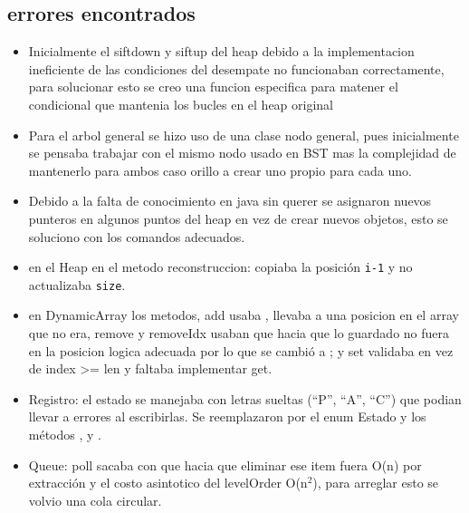 \documentclass[conference,onecolumn]{IEEEtran}
\begin{document}
\subsection{errores encontrados}
\begin{itemize}
    \item Inicialmente el siftdown y siftup del heap debido a la implementacion ineficiente de las condiciones del desempate no funcionaban correctamente, para solucionar esto se creo una funcion especifica para matener el condicional que mantenia los bucles en el heap original
    \item Para el arbol general se hizo uso de una clase nodo general, pues inicialmente se pensaba trabajar con el mismo nodo usado en BST mas la complejidad de mantenerlo para ambos caso orillo a crear uno propio para cada uno.
    \item Debido a la falta de conocimiento en java sin querer se asignaron nuevos punteros en algunos puntos del heap en vez de crear nuevos objetos, esto se soluciono con los comandos adecuados.
    
    \item en el Heap en el metodo reconstruccion: copiaba la posición \texttt{i-1} y no actualizaba \texttt{size}.
    \item en DynamicArray los metodos, add usaba , llevaba a una posicion en el array que no era, remove y removeIdx usaban  que hacia que lo guardado no fuera en la posicion logica adecuada por lo que se cambió a ; y set validaba  en vez de index >= len y  faltaba implementar get.
    \item Registro: el estado se manejaba con letras sueltas (``P'', ``A'', ``C'') que podian llevar a errores al escribirlas. Se reemplazaron por el enum Estado y los métodos ,  y .
    \item Queue: poll sacaba con  que hacia que eliminar ese item fuera O(n) por extracción y el costo asintotico del levelOrder O(n$^2$), para arreglar esto se volvio una cola circular.

\end{itemize}


\end{document}
